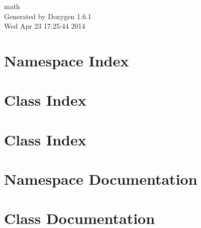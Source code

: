 \documentclass[a4paper]{book}
\begin{document}
\hypersetup{pageanchor=false}
\begin{titlepage}
\vspace*{7cm}
\begin{center}
{\Large math }\\
\vspace*{1cm}
{\large Generated by Doxygen 1.6.1}\\
\vspace*{0.5cm}
{\small Wed Apr 23 17:25:44 2014}\\
\end{center}
\end{titlepage}
\clearemptydoublepage
{}
\tableofcontents
\clearemptydoublepage
{}
\hypersetup{pageanchor=true}
\chapter{Namespace Index}

\chapter{Class Index}

\chapter{Class Index}

\chapter{Namespace Documentation}


\chapter{Class Documentation}






































\printindex
\end{document}

